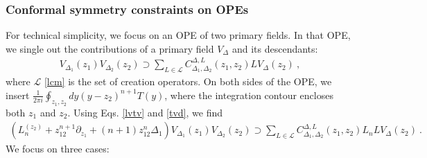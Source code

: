 \documentclass[12pt, a4paper]{article}
\theoremstyle{break}
\begin{document}
\subsubsection{Conformal symmetry constraints on OPEs}\label{sec:csope}

For technical simplicity, we focus on an OPE of two primary fields. In that OPE, we single out the contributions of a primary field $V_\Delta$ and its descendants:
\begin{align}
 V_{\Delta_1}(z_1)V_{\Delta_2}(z_2) \supset \sum_{L\in \mathcal{L}} C_{\Delta_1,\Delta_2}^{\Delta, L}(z_1,z_2) LV_\Delta(z_2) \ ,
\end{align}
where $\mathcal{L}$ \eqref{lcm} is the set of creation operators. On both sides of the OPE, we insert $\frac{1}{2\pi i}\oint_{z_1,z_2} dy (y-z_2)^{n+1}T(y)$, where the integration contour encloses both $z_1$ and $z_2$. Using Eqs. \eqref{lvtv} and \eqref{tvd}, we find
\begin{align}
 \left(L_n^{(z_2)} +z_{12}^{n+1}\partial_{z_1} + (n+1)z_{12}^n\Delta_1\right) V_{\Delta_1}(z_1)V_{\Delta_2}(z_2) \supset \sum_{L\in \mathcal{L}} C_{\Delta_1,\Delta_2}^{\Delta, L}(z_1,z_2)L_nLV_\Delta(z_2) \ .
\end{align}
We focus on three cases:
\end{document}
